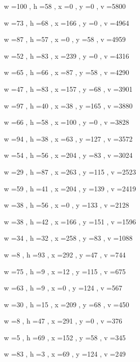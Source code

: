 \documentclass[11pt]{article}
\begin{document}
w =100 , h =58 , x =0 , y =0 , v =5800
\par
w =73 , h =68 , x =166 , y =0 , v =4964
\par
w =87 , h =57 , x =0 , y =58 , v =4959
\par
w =52 , h =83 , x =239 , y =0 , v =4316
\par
w =65 , h =66 , x =87 , y =58 , v =4290
\par
w =47 , h =83 , x =157 , y =68 , v =3901
\par
w =97 , h =40 , x =38 , y =165 , v =3880
\par
w =66 , h =58 , x =100 , y =0 , v =3828
\par
w =94 , h =38 , x =63 , y =127 , v =3572
\par
w =54 , h =56 , x =204 , y =83 , v =3024
\par
w =29 , h =87 , x =263 , y =115 , v =2523
\par
w =59 , h =41 , x =204 , y =139 , v =2419
\par
w =38 , h =56 , x =0 , y =133 , v =2128
\par
w =38 , h =42 , x =166 , y =151 , v =1596
\par
w =34 , h =32 , x =258 , y =83 , v =1088
\par
w =8 , h =93 , x =292 , y =47 , v =744
\par
w =75 , h =9 , x =12 , y =115 , v =675
\par
w =63 , h =9 , x =0 , y =124 , v =567
\par
w =30 , h =15 , x =209 , y =68 , v =450
\par
w =8 , h =47 , x =291 , y =0 , v =376
\par
w =5 , h =69 , x =152 , y =58 , v =345
\par
w =83 , h =3 , x =69 , y =124 , v =249
\par
\newpage
\end{document}

